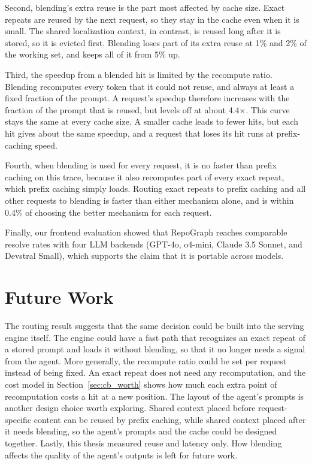 Second, blending's extra reuse is the part most affected by cache size. Exact repeats are reused by the next request, so they stay in the cache even when it is small. The shared localization context, in contrast, is reused long after it is stored, so it is evicted first. Blending loses part of its extra reuse at 1\% and 2\% of the working set, and keeps all of it from 5\% up.

Third, the speedup from a blended hit is limited by the recompute ratio. Blending recomputes every token that it could not reuse, and always at least a fixed fraction of the prompt. A request's speedup therefore increases with the fraction of the prompt that is reused, but levels off at about 4.4$\times$. This curve stays the same at every cache size. A smaller cache leads to fewer hits, but each hit gives about the same speedup, and a request that loses its hit runs at prefix-caching speed.

Fourth, when blending is used for every request, it is no faster than prefix caching on this trace, because it also recomputes part of every exact repeat, which prefix caching simply loads. Routing exact repeats to prefix caching and all other requests to blending is faster than either mechanism alone, and is within 0.4\% of choosing the better mechanism for each request.

Finally, our frontend evaluation showed that RepoGraph reaches comparable resolve rates with four LLM backends (GPT-4o, o4-mini, Claude 3.5 Sonnet, and Devstral Small), which supports the claim that it is portable across models.

\section{Future Work}
\label{sec:conclusion_future}

The routing result suggests that the same decision could be built into the serving engine itself. The engine could have a fast path that recognizes an exact repeat of a stored prompt and loads it without blending, so that it no longer needs a signal from the agent. More generally, the recompute ratio could be set per request instead of being fixed. An exact repeat does not need any recomputation, and the cost model in Section~\ref{sec:cb_worth} shows how much each extra point of recomputation costs a hit at a new position. The layout of the agent's prompts is another design choice worth exploring. Shared context placed before request-specific content can be reused by prefix caching, while shared context placed after it needs blending, so the agent's prompts and the cache could be designed together. Lastly, this thesis measured reuse and latency only. How blending affects the quality of the agent's outputs is left for future work.

